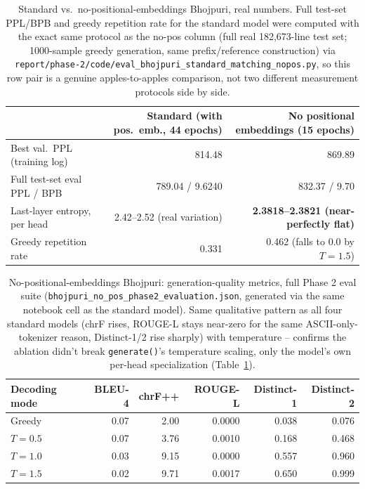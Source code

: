\documentclass[10pt,a4paper]{article}
\begin{document}
\begin{table}[H]\centering\footnotesize
\begin{tabular}{lrr}
\toprule
 & Standard (with pos.\ emb., 44 epochs) & No positional embeddings (15 epochs) \\
\midrule
Best val.\ PPL (training log) & 814.48 & 869.89 \\
Full test-set eval PPL / BPB & 789.04 / 9.6240 & 832.37 / 9.70 \\
Last-layer entropy, per head & 2.42--2.52 (real variation) & \textbf{2.3818--2.3821 (near-perfectly flat)} \\
Greedy repetition rate & 0.331 & 0.462 (falls to 0.0 by $T{=}1.5$) \\
\bottomrule
\end{tabular}
\caption{Standard vs.\ no-positional-embeddings Bhojpuri, real numbers. Full test-set PPL/BPB and
greedy repetition rate for the standard model were computed with the exact same protocol as the
no-pos column (full real 182,673-line test set; 1000-sample greedy generation, same
prefix/reference construction) via
\texttt{report/phase-2/code/eval\_bhojpuri\_standard\_matching\_nopos.py}, so this row pair is a
genuine apples-to-apples comparison, not two different measurement protocols side by side.}
\label{tab:nopos}
\end{table}
\vspace{-8pt}

\begin{table}[H]\centering\footnotesize
\begin{tabular}{lrrrrr}
\toprule
Decoding mode & BLEU-4 & chrF++ & ROUGE-L & Distinct-1 & Distinct-2 \\
\midrule
Greedy       & 0.07 & 2.00 & 0.0000 & 0.038 & 0.076 \\
$T{=}0.5$    & 0.07 & 3.76 & 0.0010 & 0.168 & 0.468 \\
$T{=}1.0$    & 0.03 & 9.15 & 0.0000 & 0.557 & 0.960 \\
$T{=}1.5$    & 0.02 & 9.71 & 0.0017 & 0.650 & 0.999 \\
\bottomrule
\end{tabular}
\caption{No-positional-embeddings Bhojpuri: generation-quality metrics, full Phase 2 eval
suite (\texttt{bhojpuri\_no\_pos\_phase2\_evaluation.json}, generated via the same notebook cell
as the standard model). Same qualitative pattern as all four standard models (chrF rises,
ROUGE-L stays near-zero for the same ASCII-only-tokenizer reason, Distinct-1/2 rise sharply) with
temperature -- confirms the ablation didn't break \texttt{generate()}'s temperature scaling, only
the model's own per-head specialization (Table~\ref{tab:nopos}).}
\label{tab:nopos-gen}
\end{table}
\vspace{-8pt}
\end{document}
